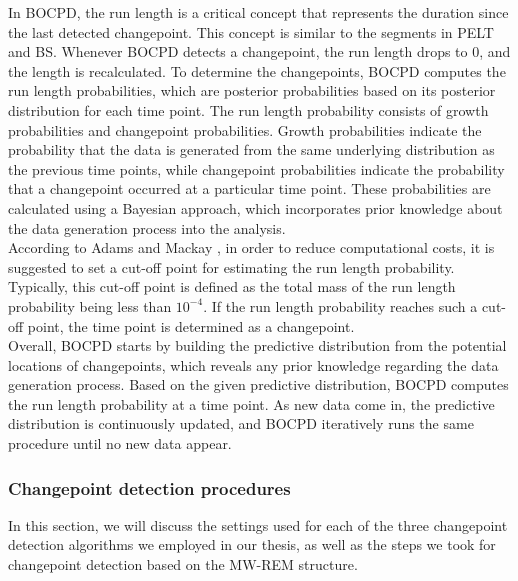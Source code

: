\documentclass[]{interact}
\theoremstyle{plain}%
\theoremstyle{definition}
\theoremstyle{remark}
\begin{document}
	In BOCPD, the run length is a critical concept that represents the duration since the last detected changepoint. This concept is similar to the segments in PELT and BS. Whenever BOCPD detects a changepoint, the run length drops to 0, and the length is recalculated. To determine the changepoints, BOCPD computes the run length probabilities, which are posterior probabilities based on its posterior distribution for each time point. The run length probability consists of growth probabilities and changepoint probabilities. Growth probabilities indicate the probability that the data is generated from the same underlying distribution as the previous time points, while changepoint probabilities indicate the probability that a changepoint occurred at a particular time point. These probabilities are calculated using a Bayesian approach, which incorporates prior knowledge about the data generation process into the analysis. \\
	
	According to Adams and Mackay \cite{adamsBayesianOnlineChangepoint2007}, in order to reduce computational costs, it is suggested to set a cut-off point for estimating the run length probability. Typically, this cut-off point is defined as the total mass of the run length probability being less than $10^{-4}$. If the run length probability reaches such a cut-off point, the time point is determined as a changepoint. \\
	
	Overall, BOCPD starts by building the predictive distribution from the potential locations of changepoints, which reveals any prior knowledge regarding the data generation process. Based on the given predictive distribution, BOCPD computes the run length probability at a time point. As new data come in, the predictive distribution is continuously updated, and BOCPD iteratively runs the same procedure until no new data appear.
	
	\subsubsection{Changepoint detection procedures} \label{sec:our method}
	
	\hspace{0.27cm} In this section, we will discuss the settings used for each of the three changepoint detection algorithms we employed in our thesis, as well as the steps we took for changepoint detection based on the MW-REM structure. \\
	
\end{document}
